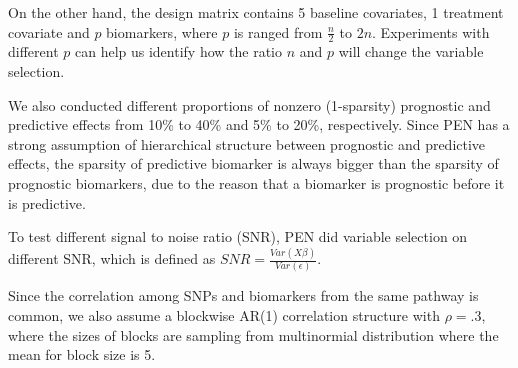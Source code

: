\documentclass[12pt]{article}
\begin{document}
On the other hand, the design matrix contains 5 baseline covariates, 1 treatment
covariate and $p$ biomarkers, where $p$ is ranged from $\frac{n}{2}$ to $2n$.
Experiments with different $p$ can help us identify how the ratio $n$ and $p$
will change the variable selection. 

We also conducted different proportions of nonzero (1-sparsity) prognostic and predictive
effects from 10\% to 40\% and 5\% to 20\%, respectively. Since PEN has a strong
assumption of hierarchical structure between prognostic and predictive effects, the sparsity
of predictive biomarker is always bigger than the sparsity of prognostic biomarkers, due 
to the reason that a biomarker is prognostic before it is predictive.


To test different signal to noise ratio (SNR), PEN did variable selection on different SNR, which
is defined as $SNR=\frac{Var(X\beta)}{Var(\epsilon)}$.

Since the correlation among SNPs and biomarkers from the same pathway is common,
we also assume a blockwise AR(1) correlation structure with $\rho = .3$, where the sizes of blocks are sampling 
from multinormial distribution where the mean for block size is 5.
\end{document}
